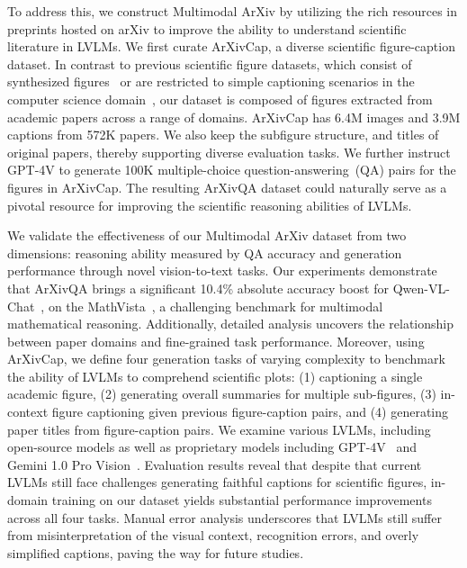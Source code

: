 To address this, we construct Multimodal ArXiv by utilizing the rich resources in preprints hosted on arXiv to improve the ability to understand scientific literature in LVLMs.
We first curate ArXivCap, a
diverse scientific figure-caption dataset.
In contrast to previous scientific figure datasets, which consist of synthesized figures~\citep{chen2020figcap}
or are restricted to simple captioning scenarios in the computer science domain~\citep{hsu-etal-2021-scicap-generating}, our dataset is composed of figures extracted from academic papers across a range of domains.
ArXivCap has 6.4M images and 3.9M captions from 572K papers. 
We also keep the subfigure structure, and titles of original papers, thereby supporting diverse evaluation tasks.
We further instruct GPT-4V to generate 100K multiple-choice question-answering~(QA) pairs for the figures in ArXivCap.
The resulting ArXivQA dataset could naturally serve as a pivotal resource for improving the scientific reasoning abilities of LVLMs.

We validate the effectiveness of our Multimodal ArXiv dataset from two dimensions: reasoning ability measured by QA accuracy and generation performance through novel vision-to-text tasks. 
Our experiments demonstrate that ArXivQA brings a significant 10.4\% absolute accuracy boost for Qwen-VL-Chat~\citep{Qwen-VL}, on the MathVista~\citep{mathvista}, a challenging benchmark for multimodal mathematical reasoning. 
Additionally, detailed analysis uncovers the relationship between paper domains and fine-grained task performance.
Moreover, using ArXivCap, we define four generation tasks of varying complexity to benchmark the ability of LVLMs to comprehend scientific plots:
(1) captioning a single academic figure, (2) generating overall summaries for multiple sub-figures, 
(3) in-context figure captioning given previous figure-caption pairs, and (4) generating paper titles from figure-caption pairs. 
We examine various LVLMs, including open-source models as well as proprietary models including GPT-4V~\citep{gpt4v} and Gemini 1.0 Pro Vision~\citep{team2023gemini}.
Evaluation results reveal that despite that current LVLMs still face challenges generating faithful captions for scientific figures, in-domain training on our dataset yields substantial performance improvements across all four tasks.
Manual error analysis underscores that LVLMs still suffer from misinterpretation of the visual context, recognition errors, and overly simplified captions, paving the way for future studies.





